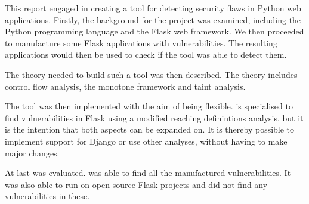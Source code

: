 This report engaged in creating a tool for detecting security flaws in Python web applications.
Firstly, the background for the project was examined, including the Python programming language and the Flask web framework.
We then proceeded to manufacture some Flask applications with vulnerabilities.
The resulting applications would then be used to check if the tool was able to detect them.

The theory needed to build such a tool was then described.
The theory includes control flow analysis, the monotone framework and taint analysis.

The tool \pyt{} was then implemented with the aim of being flexible.
\pyt{} is specialised to find vulnerabilities in Flask using a modified reaching definintions analysis, but it is the intention that both aspects can be expanded on.
It is thereby possible to implement support for Django or use other analyses, without having to make major changes.

At last \pyt{} was evaluated.
\pyt{} was able to find all the manufactured vulnerabilities.
It was also able to run on open source Flask projects and did not find any vulnerabilities in these.
